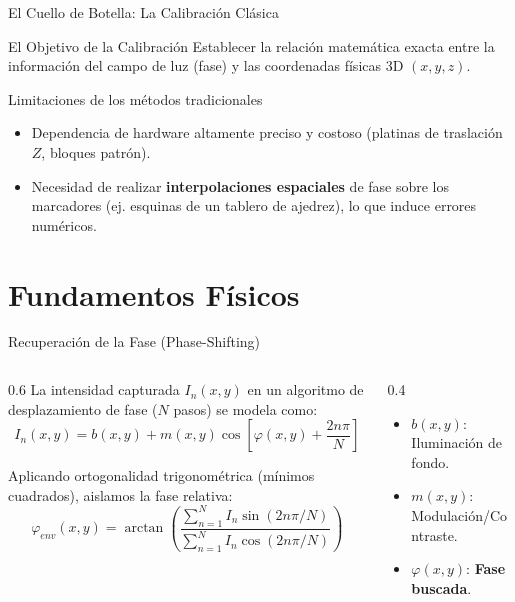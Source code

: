 \documentclass[aspectratio=169]{beamer}
\begin{document}
	\begin{frame}{El Cuello de Botella: La Calibración Clásica}
		\begin{block}{El Objetivo de la Calibración}
			Establecer la relación matemática exacta entre la información del campo de luz (fase) y las coordenadas físicas 3D $(x,y,z)$.
		\end{block}
		
		\begin{alertblock}{Limitaciones de los métodos tradicionales}
			\begin{itemize}
				\item Dependencia de hardware altamente preciso y costoso (platinas de traslación $Z$, bloques patrón).
				\item Necesidad de realizar \textbf{interpolaciones espaciales} de fase sobre los marcadores (ej. esquinas de un tablero de ajedrez), lo que induce errores numéricos.
			\end{itemize}
		\end{alertblock}
	\end{frame}
	
	\section{Fundamentos Físicos}
	
	\begin{frame}{Recuperación de la Fase (Phase-Shifting)}
		\begin{columns}
			\begin{column}{0.6\textwidth}
				La intensidad capturada $I_n(x,y)$ en un algoritmo de desplazamiento de fase ($N$ pasos) se modela como:
				\begin{equation*}
					I_{n}(x,y) = b(x,y) + m(x,y)\cos\left[\varphi(x,y) + \frac{2n\pi}{N}\right]
				\end{equation*}
				
				Aplicando ortogonalidad trigonométrica (mínimos cuadrados), aislamos la fase relativa:
				\begin{equation*}
					\varphi_{env}(x,y) = \arctan \left( \frac{\sum_{n=1}^{N} I_n \sin(2n\pi/N)}{\sum_{n=1}^{N} I_n \cos(2n\pi/N)} \right)
				\end{equation*}
			\end{column}
			\begin{column}{0.4\textwidth}
				\begin{itemize}
					\item $b(x,y)$: Iluminación de fondo.
					\item $m(x,y)$: Modulación/Contraste.
					\item $\varphi(x,y)$: \textbf{Fase buscada}.
				\end{itemize}
				
			\end{column}
		\end{columns}
	\end{frame}
	
\end{document}
